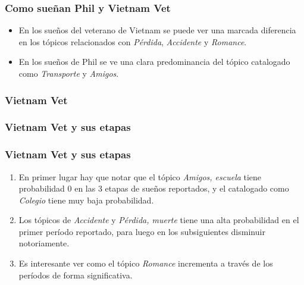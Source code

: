 \documentclass{beamer}
\begin{document}
\begin{frame}
\frametitle{Como sueñan Phil y Vietnam Vet}
\begin{itemize}
[triangle]
    \item En los sueños del veterano de Vietnam se puede ver una marcada diferencia en los tópicos relacionados con \textit{Pérdida}, \textit{Accidente} y \textit{Romance}.
    \item En los sueños de Phil se ve una clara predominancia del tópico catalogado como \textit{Transporte} y \textit{Amigos}.
\end{itemize}
    
\end{frame}

\subsubsection{Vietnam Vet}

\begin{frame}
\frametitle{Vietnam Vet y sus etapas}
\end{frame}

\begin{frame}
\frametitle{Vietnam Vet y sus etapas}
\begin{enumerate}
    \item En primer lugar hay que notar que el tópico \textit{Amigos, escuela} tiene probabilidad 0 en las 3 etapas de sueños reportados, y el catalogado como \textit{Colegio} tiene muy baja probabilidad.
    \item Los tópicos de \textit{Accidente} y \textit{Pérdida, muerte} tiene una alta probabilidad en el primer período reportado, para luego en los subsiguientes disminuir notoriamente.
    \item Es interesante ver como el tópico \textit{Romance} incrementa a través de los períodos de forma significativa.
\end{enumerate}
\end{frame}
\end{document}
